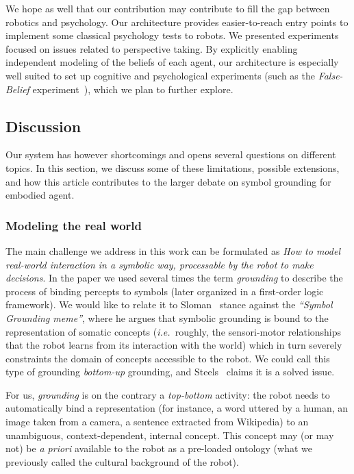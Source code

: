 \documentclass[twocolumn]{svjour3}
\newcommand{\ie}{{\textit{i.e.~}}}
\begin{document}

We hope as well that our contribution may contribute to fill the gap between
robotics and psychology. Our architecture provides easier-to-reach entry points
to implement some classical psychology tests to robots. We presented
experiments focused on issues related to perspective taking. By explicitly
enabling independent modeling of the beliefs of each agent, our architecture is
especially well suited to set up cognitive and psychological experiments (such as the \emph{False-Belief} experiment~\cite{Leslie2000}), which we plan to further explore.

\subsection{Discussion}

Our system has however shortcomings and opens several questions on different
topics.  In this section, we discuss some of these limitations, possible
extensions, and how this article contributes to the larger debate on symbol
grounding for embodied agent.

\subsubsection{Modeling the real world}

The main challenge we address in this work can be formulated as \emph{How to
model real-world interaction in a symbolic way, processable by the robot to
make decisions}. In the paper we used several times the term \emph{grounding} to
describe the process of binding percepts to symbols (later organized in a
first-order logic framework).  We would like to relate it to
Sloman~\cite{Sloman2007} stance against the \emph{``Symbol Grounding meme''},
where he argues that symbolic grounding is bound to the representation of
somatic concepts (\ie roughly, the sensori-motor relationships that the robot
learns from its interaction with the world) which in turn severely constraints
the domain of concepts accessible to the robot. We could call this type of
grounding \emph{bottom-up} grounding, and Steels~\cite{Steels2007} claims it is
a solved issue.

For us, \emph{grounding} is on the contrary a \emph{top-bottom} activity: the
robot needs to automatically bind a representation (for instance, a word
uttered by a human, an image taken from a camera, a sentence extracted from
Wikipedia) to an unambiguous, context-dependent, internal concept. This 
concept may (or may not) be \textit{a priori} available to the robot as a
pre-loaded ontology (what we previously called the cultural background of the
robot).
\end{document}
